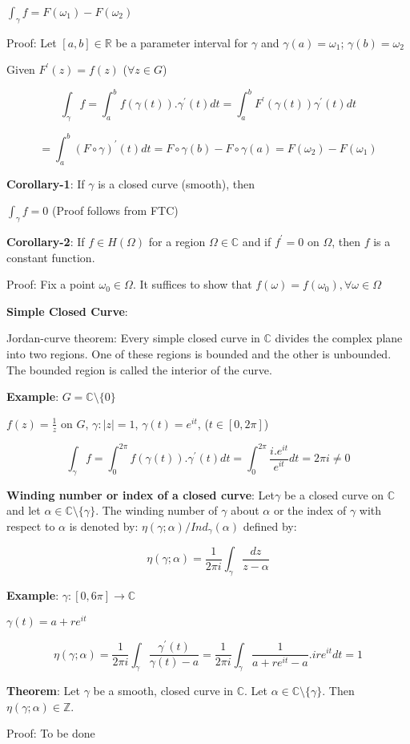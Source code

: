 \documentclass{article}
\begin{document}
\begin{flushleft}
$\int_{\gamma}^{} f = F(\omega_1) - F(\omega_2)$

Proof: Let $[a,b]\in \mathds{R}$ be a parameter interval for $\gamma$ and $\gamma(a)=\omega_1$; $\gamma(b)=\omega_2$

Given $F^{'}(z)=f(z)$   ($\forall z \in G$)

$$\int_{\gamma}^{} f = \int_{a}^{b} f(\gamma(t)).\gamma^{'}(t) dt = \int_{a}^{b} F^{'}(\gamma(t))\gamma^{'}(t) dt$$

$$= \int_{a}^{b} (F \circ \gamma)^{'}(t) dt = F \circ \gamma(b)-F \circ \gamma(a)= F(\omega_2)-F(\omega_1)$$

\textbf{Corollary-1}: If $\gamma$ is a closed curve (smooth), then

$\int_{\gamma}^{} f =0$ (Proof follows from FTC)

\textbf{Corollary-2}: If $f\in H(\Omega)$ for a region $\Omega\in \mathds{C}$ and if $f^{'}=0$ on $\Omega$, then $f$ is a constant function.

Proof: Fix a point $\omega_0\in \Omega$. It suffices to show that $f(\omega)=f(\omega_0), \forall \omega \in \Omega$

\textbf{Simple Closed Curve}: 

Jordan-curve theorem: Every simple closed curve in $\mathds{C}$ divides the complex plane into two regions. One of these regions is bounded and the other is unbounded. The bounded region is called the interior of the curve.

\textbf{Example}: $G=\mathds{C}\setminus \{0\}$

$f(z)=\frac{1}{z}$ on $G$, $\gamma: |z|=1$, $\gamma(t)=e^{it}$, ($t\in [0,2\pi]$)

$$\int_{\gamma}^{} f= \int_{0}^{2\pi} f(\gamma(t)).\gamma^{'}(t) dt= \int_{0}^{2\pi} \frac{i.e^{it}}{e^{it}} dt =2\pi i\neq 0$$

\textbf{Winding number or index of a closed curve}:
Let$\gamma$ be a closed curve on $\mathds{C}$ and let $\alpha \in \mathds{C}\setminus \{\gamma\}$. The winding number of $\gamma$ about $\alpha$ or the index of $\gamma$ with respect to $\alpha$ is denoted by:
$\eta(\gamma;\alpha)/Ind_{\gamma}(\alpha)$ defined by:

$$\eta(\gamma;\alpha)=\frac{1}{2\pi i}\int_{\gamma}^{}\frac{dz}{z-\alpha}$$

\textbf{Example}: $\gamma: [0,6\pi]\rightarrow \mathds{C}$ 

$\gamma(t)=a+re^{it}$ 

$$\eta(\gamma;\alpha)=\frac{1}{2\pi i}\int_{\gamma}^{} \frac{\gamma^{'}(t)}{\gamma(t)-a}=\frac{1}{2\pi i}\int_{\gamma}^{} \frac{1}{a+re^{it}-a}.ire^{it} dt=1$$

\textbf{Theorem}: Let $\gamma$ be a smooth, closed curve in $\mathds{C}$. Let $\alpha\in \mathds{C}\setminus \{\gamma\}$. Then $\eta(\gamma;\alpha)\in \mathds{Z}$.

Proof: To be done


\end{flushleft}
\end{document}

